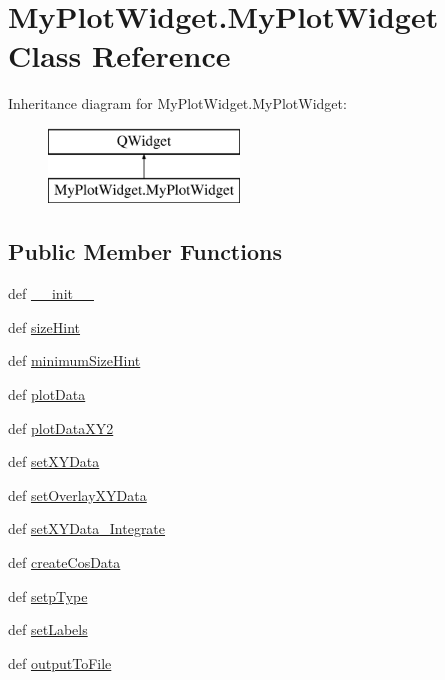 \hypertarget{class_my_plot_widget_1_1_my_plot_widget}{\section{My\-Plot\-Widget.\-My\-Plot\-Widget Class Reference}
\label{class_my_plot_widget_1_1_my_plot_widget}
}
Inheritance diagram for My\-Plot\-Widget.\-My\-Plot\-Widget\-:\begin{figure}[H]
\begin{center}
\leavevmode
\includegraphics[height=2.000000cm]{class_my_plot_widget_1_1_my_plot_widget}
\end{center}
\end{figure}
\subsection*{Public Member Functions}
\begin{DoxyCompactItemize}
\item 
def \hyperlink{class_my_plot_widget_1_1_my_plot_widget_a6609ab444ac92ada3d856756c4d63ff3}{\-\_\-\-\_\-init\-\_\-\-\_\-}
\item 
def \hyperlink{class_my_plot_widget_1_1_my_plot_widget_a7cc35e9fdcea629d444e69c9be1f17e5}{size\-Hint}
\item 
def \hyperlink{class_my_plot_widget_1_1_my_plot_widget_a24bbe5fb4b29afdb328e65616fd49607}{minimum\-Size\-Hint}
\item 
def \hyperlink{class_my_plot_widget_1_1_my_plot_widget_a51f5c70ea2dd4024e4c56a0a73925164}{plot\-Data}
\item 
def \hyperlink{class_my_plot_widget_1_1_my_plot_widget_aa715ad5a13d60bef1d1d8f35d17a128d}{plot\-Data\-X\-Y2}
\item 
def \hyperlink{class_my_plot_widget_1_1_my_plot_widget_adf3455693401acc7a41cc2b167c8ea7d}{set\-X\-Y\-Data}
\item 
def \hyperlink{class_my_plot_widget_1_1_my_plot_widget_a6298a336d89650749a4c04e28bcf4274}{set\-Overlay\-X\-Y\-Data}
\item 
def \hyperlink{class_my_plot_widget_1_1_my_plot_widget_ac55f01d08b5bf74fe1bfeb2719747a92}{set\-X\-Y\-Data\-\_\-\-Integrate}
\item 
def \hyperlink{class_my_plot_widget_1_1_my_plot_widget_a2ba64fd7e8dd68a755267f4fbcde2b45}{create\-Cos\-Data}
\item 
def \hyperlink{class_my_plot_widget_1_1_my_plot_widget_a866f749621b291e90310593be2c612f8}{setp\-Type}
\item 
def \hyperlink{class_my_plot_widget_1_1_my_plot_widget_a9363485b431a40f93626e21842248589}{set\-Labels}
\item 
def \hyperlink{class_my_plot_widget_1_1_my_plot_widget_ae782a56a3f86e3e4a7c57fcc3ab55fa7}{output\-To\-File}
\end{DoxyCompactItemize}
